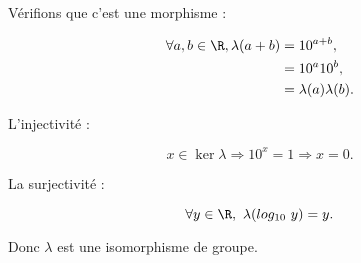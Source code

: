 Vérifions que c'est une morphisme :

\begin{align*}
    \forall a,b \in \R, \lambda(a+b) &= 10^{a+b}, \\
    &=10^a 10^b, \\
    &=\lambda(a)\lambda(b).
\end{align*}

L'injectivité :

\[x \in \ker \lambda \Rightarrow 10^x = 1 \Rightarrow x = 0.\]

La surjectivité :

\[\forall y\in \R,\ \lambda(log_{10}\ y) = y.\]

Donc $\lambda$ est une isomorphisme de groupe.